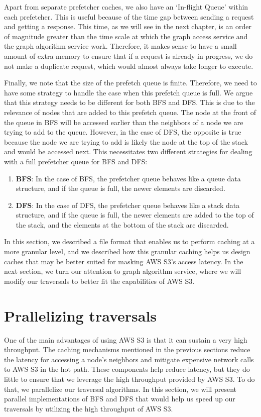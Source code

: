 \medskip
Apart from separate prefetcher caches, we also have an `In-flight Queue' within
each prefetcher. This is useful because of the time gap between sending a
request and getting a response. This time, as we will see in the next chapter,
is an order of magnitude greater than the time scale at which the graph access
service and the graph algorithm service work. Therefore, it makes sense to have
a small amount of extra memory to ensure that if a request is already in
progress, we do not make a duplicate request, which would almost always take
longer to execute. 

\medskip
Finally, we note that the size of the prefetch queue is finite. Therefore, we
need to have some strategy to handle the case when this prefetch queue is full.
We argue that this strategy needs to be different for both BFS and DFS. This is
due to the relevance of nodes that are added to this prefetch queue. The node at
the front of the queue in BFS will be accessed earlier than the neighbors of a
node we are trying to add to the queue. However, in the case of DFS, the
opposite is true because the node we are trying to add is likely the node
at the top of the stack and would be accessed next. This necessitates two
different strategies for dealing with a full prefetcher queue for BFS and DFS:
\begin{enumerate}
    \item \textbf{BFS}: In the case of BFS, the prefetcher queue behaves like a
        queue data structure, and if the queue is full, the newer elements are
        discarded.
    \item \textbf{DFS}: In the case of DFS, the prefetcher queue behaves like a
        stack data structure, and if the queue is full, the newer elements
        are added to the top of the stack, and the elements at the bottom of the
        stack are discarded.
\end{enumerate}

\bigskip
In this section, we described a file format that enables us to perform caching
at a more granular level, and we described how this granular caching helps us
design caches that may be better suited for masking AWS S3's access latency.
In the next section, we turn our
attention to graph algorithm service, where we will modify our traversals to
better fit the capabilities of AWS S3.


\section{Prallelizing traversals}\label{sec:parallelAlgorithms}
One of the main advantages of using AWS S3 is that it can sustain a very
high throughput. The caching mechanisms mentioned in the previous sections
reduce the latency for accessing a node's neighbors and mitigate expensive
network calls to AWS S3 in the hot path. These components help reduce
latency, but they do little to ensure that we leverage the
high throughput provided by AWS S3. To do that, we parallelize our
traversal algorithms. In this section, we will present parallel implementations
of BFS and DFS that would help us speed up our traversals by utilizing the
high throughput of AWS S3.

